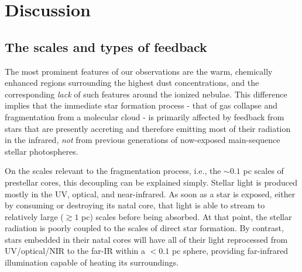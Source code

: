 \documentclass{emulateapj}
\begin{document}
%
%



\section{Discussion}
\label{sec:discussion}
\subsection{The scales and types of feedback}
\label{sec:feedbackscales}
The most prominent features of our observations are the warm, chemically
enhanced regions surrounding the highest dust concentrations, and the
corresponding \emph{lack} of such features around the ionized nebulae.  This
difference implies that the immediate star formation process - that of gas
collapse and fragmentation from a molecular cloud - is primarily affected by
feedback from stars that are presently accreting and therefore emitting most of
their radiation in the infrared, \emph{not} from previous generations of
now-exposed main-sequence stellar photospheres.

On the scales relevant to the fragmentation process, i.e., the $\sim0.1$ pc
scales of prestellar cores, this decoupling can be explained simply.  Stellar
light is produced mostly in the UV, optical, and near-infrared.  As soon as a
star is exposed, either by consuming or destroying its natal core, that light
is able to stream to relatively large ($\gtrsim1$ pc) scales before being
absorbed.  At that point, the stellar radiation is poorly coupled to the scales
of direct star formation.  By contrast, stars embedded in their natal cores
will have all of their light reprocessed from UV/optical/NIR to the far-IR
within a $<0.1$ pc sphere, providing far-infrared illumination capable of
heating its surroundings.
\end{document}
